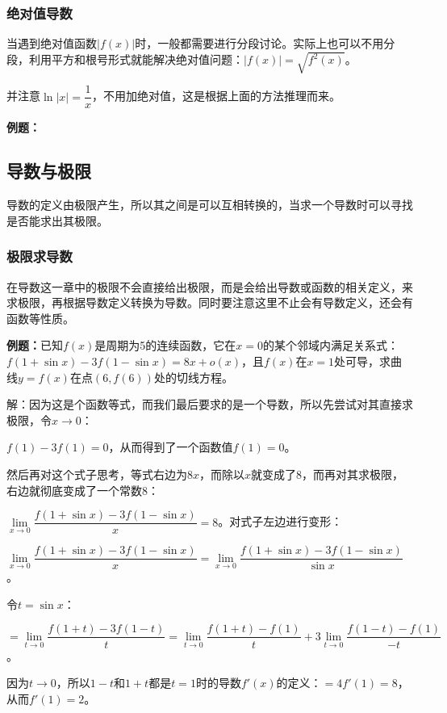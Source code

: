 \subsubsection{绝对值导数}

当遇到绝对值函数$\vert f(x)\vert$时，一般都需要进行分段讨论。实际上也可以不用分段，利用平方和根号形式就能解决绝对值问题：$\vert f(x)\vert=\sqrt{f^2(x)}$。

并注意$\ln\vert x\vert=\dfrac{1}{x}$，不用加绝对值，这是根据上面的方法推理而来。

\textbf{例题：}

\subsection{导数与极限}

导数的定义由极限产生，所以其之间是可以互相转换的，当求一个导数时可以寻找是否能求出其极限。

\subsubsection{极限求导数}

在导数这一章中的极限不会直接给出极限，而是会给出导数或函数的相关定义，来求极限，再根据导数定义转换为导数。同时要注意这里不止会有导数定义，还会有函数等性质。

\textbf{例题：}已知$f(x)$是周期为5的连续函数，它在$x=0$的某个邻域内满足关系式：$f(1+\sin x)-3f(1-\sin x)= 8x+o(x)$，且$f(x)$在$x=1$处可导，求曲线$y=f(x)$在点$(6,f(6))$处的切线方程。

解：因为这是个函数等式，而我们最后要求的是一个导数，所以先尝试对其直接求极限，令$x\to0$：

$f(1)-3f(1)=0$，从而得到了一个函数值$f(1)=0$。

然后再对这个式子思考，等式右边为$8x$，而除以$x$就变成了8，而再对其求极限，右边就彻底变成了一个常数8：

$\lim\limits_{x\to 0}\dfrac{f(1+\sin x)-3f(1-\sin x)}{x}=8$。对式子左边进行变形：

$\lim\limits_{x\to 0}\dfrac{f(1+\sin x)-3f(1-\sin x)}{x}=\lim\limits_{x\to 0}\dfrac{f(1+\sin x)-3f(1-\sin x)}{\sin x}$。

令$t=\sin x$：

$=\lim\limits_{t\to 0}\dfrac{f(1+t)-3f(1-t)}{t}=\lim\limits_{t\to 0}\dfrac{f(1+t)-f(1)}{t}+3\lim\limits_{t\to 0}\dfrac{f(1-t)-f(1)}{-t}$。

因为$t\to 0$，所以$1-t$和$1+t$都是$t=1$时的导数$f'(x)$的定义：$=4f'(1)=8$，从而$f'(1)=2$。

